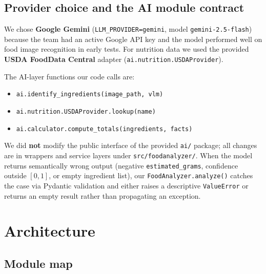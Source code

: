 \documentclass[11pt,a4paper]{article}
\begin{document}
\subsection{Provider choice and the AI module contract}

We chose \textbf{Google Gemini} (\texttt{LLM\_PROVIDER=gemini}, model \texttt{gemini-2.5-flash}) because the team had an active Google API key and the model performed well on food image recognition in early tests.
For nutrition data we used the provided \textbf{USDA FoodData Central} adapter (\texttt{ai.nutrition.USDAProvider}).

The AI-layer functions our code calls are:
\begin{itemize}[topsep=2pt,itemsep=1pt]
  \item \texttt{ai.identify\_ingredients(image\_path, vlm)}
  \item \texttt{ai.nutrition.USDAProvider.lookup(name)}
  \item \texttt{ai.calculator.compute\_totals(ingredients, facts)}
\end{itemize}

We did \textbf{not} modify the public interface of the provided \texttt{ai/} package; all changes are in wrappers and service layers under \texttt{src/foodanalyzer/}.
When the model returns semantically wrong output (negative \texttt{estimated\_grams}, confidence outside $[0,1]$, or empty ingredient list), our \texttt{FoodAnalyzer.analyze()} catches the case via Pydantic validation and either raises a descriptive \texttt{ValueError} or returns an empty result rather than propagating an exception.

\section{Architecture}\label{sec:arch}

\subsection{Module map}
\end{document}
